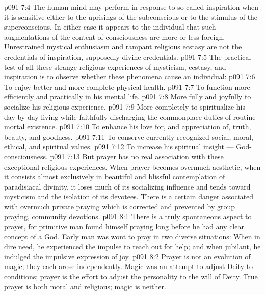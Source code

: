 \vs p091 7:4 The human mind may perform in response to so\hyp{}called inspiration when it is sensitive either to the uprisings of the subconscious or to the stimulus of the superconscious. In either case it appears to the individual that such augmentations of the content of consciousness are more or less foreign. Unrestrained mystical enthusiasm and rampant religious ecstasy are not the credentials of inspiration, supposedly divine credentials.
\vs p091 7:5 The practical test of all these strange religious experiences of mysticism, ecstasy, and inspiration is to observe whether these phenomena cause an individual:
\vs p091 7:6 \bibnobreakspace To enjoy better and more complete physical health.
\vs p091 7:7 \bibnobreakspace To function more efficiently and practically in his mental life.
\vs p091 7:8 \bibnobreakspace More fully and joyfully to socialize his religious experience.
\vs p091 7:9 \bibnobreakspace More completely to spiritualize his day\hyp{}by\hyp{}day living while faithfully discharging the commonplace duties of routine mortal existence.
\vs p091 7:10 \bibnobreakspace To enhance his love for, and appreciation of, truth, beauty, and goodness.
\vs p091 7:11 \bibnobreakspace To conserve currently recognized social, moral, ethical, and spiritual values.
\vs p091 7:12 \bibnobreakspace To increase his spiritual insight --- God\hyp{}consciousness.
\vs p091 7:13 \pc But prayer has no real association with these exceptional religious experiences. When prayer becomes overmuch aesthetic, when it consists almost exclusively in beautiful and blissful contemplation of paradisiacal divinity, it loses much of its socializing influence and tends toward mysticism and the isolation of its devotees. There is a certain danger associated with overmuch private praying which is corrected and prevented by group praying, community devotions.
\vs p091 8:1 There is a truly spontaneous aspect to prayer, for primitive man found himself praying long before he had any clear concept of a God. Early man was wont to pray in two diverse situations: When in dire need, he experienced the impulse to reach out for help; and when jubilant, he indulged the impulsive expression of joy.
\vs p091 8:2 \pc Prayer is not an evolution of magic; they each arose independently. Magic was an attempt to adjust Deity to conditions; prayer is the effort to adjust the personality to the will of Deity. True prayer is both moral and religious; magic is neither.
